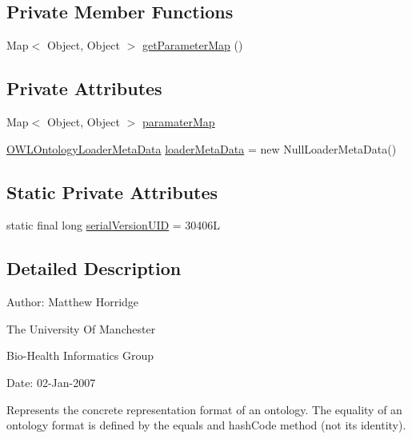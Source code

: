 \subsection*{Private Member Functions}
\begin{DoxyCompactItemize}
\item 
Map$<$ Object, Object $>$ \hyperlink{classorg_1_1semanticweb_1_1owlapi_1_1model_1_1_o_w_l_ontology_format_acf3826eb758b6865cb38f60608407b4c}{get\-Parameter\-Map} ()
\end{DoxyCompactItemize}
\subsection*{Private Attributes}
\begin{DoxyCompactItemize}
\item 
Map$<$ Object, Object $>$ \hyperlink{classorg_1_1semanticweb_1_1owlapi_1_1model_1_1_o_w_l_ontology_format_acd6e5128883cf63f4a4d51b29b84bde0}{paramater\-Map}
\item 
\hyperlink{interfaceorg_1_1semanticweb_1_1owlapi_1_1io_1_1_o_w_l_ontology_loader_meta_data}{O\-W\-L\-Ontology\-Loader\-Meta\-Data} \hyperlink{classorg_1_1semanticweb_1_1owlapi_1_1model_1_1_o_w_l_ontology_format_ac73e8fb3327a67e4769794c3910d33cb}{loader\-Meta\-Data} = new Null\-Loader\-Meta\-Data()
\end{DoxyCompactItemize}
\subsection*{Static Private Attributes}
\begin{DoxyCompactItemize}
\item 
static final long \hyperlink{classorg_1_1semanticweb_1_1owlapi_1_1model_1_1_o_w_l_ontology_format_ab22a7cef735fd33f4efecadc2ac3a741}{serial\-Version\-U\-I\-D} = 30406\-L
\end{DoxyCompactItemize}


\subsection{Detailed Description}
Author\-: Matthew Horridge\par
 The University Of Manchester\par
 Bio-\/\-Health Informatics Group\par
 Date\-: 02-\/\-Jan-\/2007\par
\par


Represents the concrete representation format of an ontology. The equality of an ontology format is defined by the equals and hash\-Code method (not its identity). 

